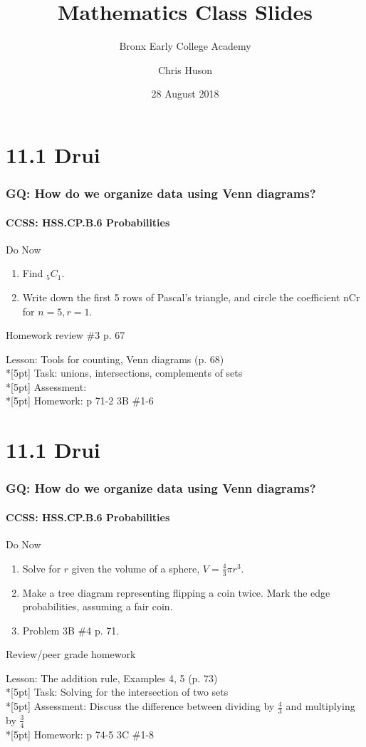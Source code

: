 \documentclass{beamer}
\title{Mathematics Class Slides}
\subtitle{Bronx Early College Academy}
\author{Chris Huson}
\date{28 August 2018}
\begin{document}
\frame{\titlepage}


  \section{11.1 Drui}
  \frame
  {
    \frametitle{GQ: How do we organize data using Venn diagrams?}
    \framesubtitle{CCSS: HSS.CP.B.6 Probabilities}

    \begin{block}{Do Now}
    \begin{enumerate}
        \item Find $_5C_1$.
        \item Write down the first 5 rows of Pascal's triangle, and circle the coefficient nCr for $n=5, r=1$.
    \end{enumerate}
    Homework review \#3 p. 67
    \end{block}
    Lesson: Tools for counting, Venn diagrams (p. 68)\\*[5pt]
    Task: unions, intersections, complements of sets\\*[5pt]
    Assessment:  \\*[5pt]
    Homework: p 71-2 3B \#1-6
  }
  \section{11.1 Drui}
  \frame
  {
    \frametitle{GQ: How do we organize data using Venn diagrams?}
    \framesubtitle{CCSS: HSS.CP.B.6 Probabilities}

    \begin{block}{Do Now}
    \begin{enumerate}
        \item Solve for $r$ given the volume of a sphere, $V=\frac{4}{3} \pi r^3$.
        \item Make a tree diagram representing flipping a coin twice. Mark the edge probabilities, assuming a fair coin.
        \item Problem 3B \#4 p. 71.
    \end{enumerate}
    Review/peer grade homework
    \end{block}
    Lesson: The addition rule, Examples 4, 5 (p. 73)\\*[5pt]
    Task: Solving for the intersection of two sets\\*[5pt]
    Assessment: Discuss the difference between dividing by $\frac{4}{3}$ and multiplying by $\frac{3}{4}$\\*[5pt]
    Homework: p 74-5 3C \#1-8
  }
\end{document}
